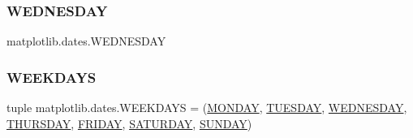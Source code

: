 \subsubsection{\texorpdfstring{W\+E\+D\+N\+E\+S\+D\+AY}{WEDNESDAY}}
{\footnotesize\ttfamily matplotlib.\+dates.\+W\+E\+D\+N\+E\+S\+D\+AY}

\mbox{\label{namespacematplotlib_1_1dates_affa371e887e3f8e12bc2e22edddb9208}} 
\subsubsection{\texorpdfstring{W\+E\+E\+K\+D\+A\+YS}{WEEKDAYS}}
{\footnotesize\ttfamily tuple matplotlib.\+dates.\+W\+E\+E\+K\+D\+A\+YS = (\hyperlink{namespacematplotlib_1_1dates_a33dfa1d33cbbebe95092b647310133cc}{M\+O\+N\+D\+AY}, \hyperlink{namespacematplotlib_1_1dates_a68238181f37f9d090ab4833b6f25db1f}{T\+U\+E\+S\+D\+AY}, \hyperlink{namespacematplotlib_1_1dates_a6eb9f50c83c74cfff91d744a261c9ae5}{W\+E\+D\+N\+E\+S\+D\+AY}, \hyperlink{namespacematplotlib_1_1dates_aeb266ae70b586ae874354bfa8d627d03}{T\+H\+U\+R\+S\+D\+AY}, \hyperlink{namespacematplotlib_1_1dates_a98c04cbbc7ce4500f8462a5e83320285}{F\+R\+I\+D\+AY}, \hyperlink{namespacematplotlib_1_1dates_a438840c894f971e4be985e6363c432a2}{S\+A\+T\+U\+R\+D\+AY}, \hyperlink{namespacematplotlib_1_1dates_af79f27c0b2f2555e579995fac862198c}{S\+U\+N\+D\+AY})}

